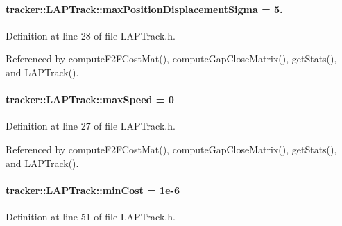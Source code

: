 \paragraph[{\texorpdfstring{max\+Position\+Displacement\+Sigma}{maxPositionDisplacementSigma}}]{ tracker\+::\+L\+A\+P\+Track\+::max\+Position\+Displacement\+Sigma = 5.}\hypertarget{classtracker_1_1LAPTrack_ad3662aeeb356ae8dd4070f583a8ba9c9}{}\label{classtracker_1_1LAPTrack_ad3662aeeb356ae8dd4070f583a8ba9c9}


Definition at line 28 of file L\+A\+P\+Track.\+h.



Referenced by compute\+F2\+F\+Cost\+Mat(), compute\+Gap\+Close\+Matrix(), get\+Stats(), and L\+A\+P\+Track().

\paragraph[{\texorpdfstring{max\+Speed}{maxSpeed}}]{ tracker\+::\+L\+A\+P\+Track\+::max\+Speed = 0}\hypertarget{classtracker_1_1LAPTrack_a8da459415ca2bb4f3d57b3c8db87e66e}{}\label{classtracker_1_1LAPTrack_a8da459415ca2bb4f3d57b3c8db87e66e}


Definition at line 27 of file L\+A\+P\+Track.\+h.



Referenced by compute\+F2\+F\+Cost\+Mat(), compute\+Gap\+Close\+Matrix(), get\+Stats(), and L\+A\+P\+Track().

\paragraph[{\texorpdfstring{min\+Cost}{minCost}}]{ tracker\+::\+L\+A\+P\+Track\+::min\+Cost = 1e-\/6\hspace{0.3cm}{\ttfamily [protected]}}\hypertarget{classtracker_1_1LAPTrack_a6909c7f712dc8abbde326ef7c77d3885}{}\label{classtracker_1_1LAPTrack_a6909c7f712dc8abbde326ef7c77d3885}


Definition at line 51 of file L\+A\+P\+Track.\+h.

